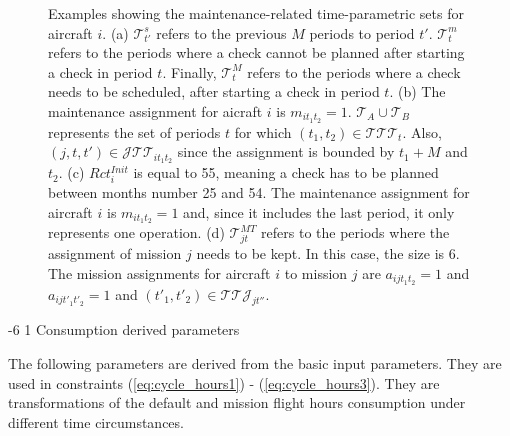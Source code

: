 \documentclass[a4paper,onecolumn,fleqn]{article}
\makeatletter
\renewcommand\subsubsection{\@startsection{subsubsection}{3}{\z@}%
                       {-6\p@ \@plus -0\p@ \@minus -0\p@}%
                       {1\p@ \@plus 0\p@ \@minus 0\p@}%
                       {\normalsize\itshape\bfseries}}
\makeatother
\begin{document}
    \begin{figure}
        \centering
        \begin{tikzpicture}
            
        \end{tikzpicture}
        \begin{tikzpicture}
            
        \end{tikzpicture}
        \begin{tikzpicture}
            
        \end{tikzpicture}
        \caption{Examples showing the maintenance-related time-parametric sets for aircraft $i$. (a) $\mathcal{T}_{t'}^{s}$ refers to the previous $M$ periods to period $t'$. $\mathcal{T}_{t}^{m}$ refers to the periods where a check cannot be planned after starting a check in period $t$. Finally, $\mathcal{T}_{t}^{M}$ refers to the periods where a check needs to be scheduled, after starting a check in period $t$. (b) The maintenance assignment for aicraft $i$ is $m_{it_1t_2}=1$. $\mathcal{T}_A \cup \mathcal{T}_B$ represents the set of periods $t$ for which $(t_1, t_2) \in \mathcal{TTT}_t$. Also, $(j, t, t') \in \mathcal{J}\mathcal{T}\mathcal{T}_{it_1t_2}$ since the assignment is bounded by $t_1 + M$ and $t_2$. (c) $Rct_{i}^{Init}$ is equal to 55, meaning a check has to be planned between months number 25 and 54. The maintenance assignment for aircraft $i$ is $m_{it_1t_2}=1$ and, since it includes the last period, it only represents one operation. (d) $\mathcal{T}_{jt}^{MT}$ refers to the periods where the assignment of mission $j$ needs to be kept. In this case, the size is 6. The mission assignments for aircraft $i$ to mission $j$ are $a_{ijt_1t_2}=1$ and $a_{ijt'_1t'_2}=1$ and $(t'_1, t'_2) \in \mathcal{T}\mathcal{T}\mathcal{J}_{jt''}$.}
        \label{fig:gantt_windows}
    \end{figure}

    \subsubsection{Consumption derived parameters}\label{subsubsec:consumption}

    The following parameters are derived from the basic input parameters. They are used in constraints (\ref{eq:cycle_hours1}) - (\ref{eq:cycle_hours3}). They are transformations of the default and mission flight hours consumption under different time circumstances.
\end{document}
